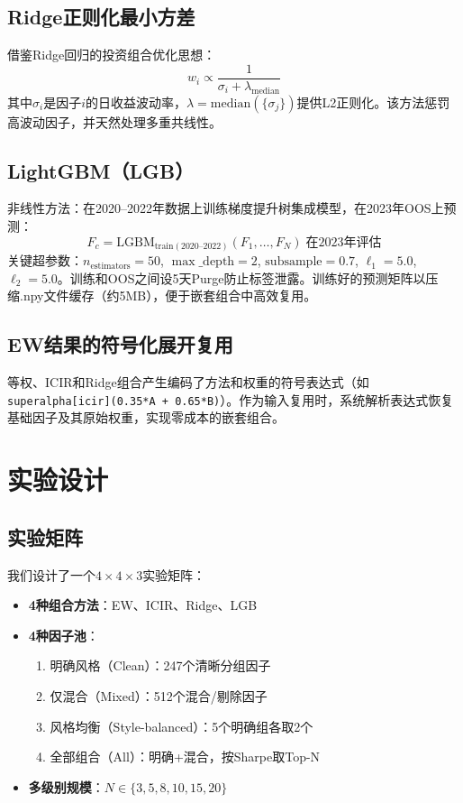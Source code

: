 \documentclass[11pt,a4paper]{ctexart}
\begin{document}
\subsection{Ridge正则化最小方差}
借鉴Ridge回归的投资组合优化思想：
\begin{equation}
w_i \propto \frac{1}{\sigma_i + \lambda_{\text{median}}}
\end{equation}
其中$\sigma_i$是因子$i$的日收益波动率，$\lambda = \text{median}(\{\sigma_j\})$提供L2正则化。该方法惩罚高波动因子，并天然处理多重共线性。

\subsection{LightGBM（LGB）}
非线性方法：在2020--2022年数据上训练梯度提升树集成模型，在2023年OOS上预测：
\begin{equation}
F_c = \text{LGBM}_{\text{train}(2020\text{--}2022)}(F_1, \ldots, F_N) \; \text{在2023年评估}
\end{equation}
关键超参数：$n_{\text{estimators}}=50$, $\max\_\text{depth}=2$, $\text{subsample}=0.7$, $\ell_1=5.0$, $\ell_2=5.0$。训练和OOS之间设5天Purge防止标签泄露。训练好的预测矩阵以压缩.npy文件缓存（约5MB），便于嵌套组合中高效复用。

\subsection{EW结果的符号化展开复用}
等权、ICIR和Ridge组合产生编码了方法和权重的符号表达式（如\texttt{superalpha[icir](0.35*A + 0.65*B)}）。作为输入复用时，系统解析表达式恢复基础因子及其原始权重，实现零成本的嵌套组合。

\section{实验设计}

\subsection{实验矩阵}

我们设计了一个$4 \times 4 \times 3$实验矩阵：

\begin{itemize}[nosep]
    \item \textbf{4种组合方法}：EW、ICIR、Ridge、LGB
    \item \textbf{4种因子池}：
        \begin{enumerate}[nosep]
            \item 明确风格（Clean）：247个清晰分组因子
            \item 仅混合（Mixed）：512个混合/剔除因子
            \item 风格均衡（Style-balanced）：5个明确组各取2个
            \item 全部组合（All）：明确+混合，按Sharpe取Top-N
        \end{enumerate}
    \item \textbf{多级别规模}：$N \in \{3,5,8,10,15,20\}$
\end{itemize}
\end{document}
